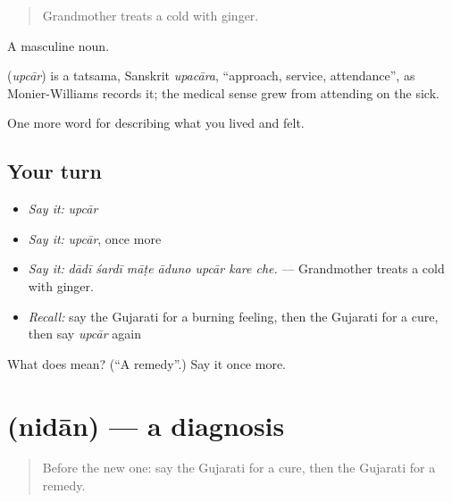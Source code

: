 \begin{quote}
Grandmother treats a cold with ginger.
\end{quote}

A masculine noun.

\begin{cousinweb}
\textbf{} (\emph{upcār}) is a tatsama, Sanskrit \emph{upacāra}, \textquotedblleft{}approach, service, attendance\textquotedblright{}, as Monier-Williams records it; the medical sense grew from attending on the sick.
\end{cousinweb}

\begin{grammarlens}[title={What you've built}]
One more word for describing what you lived and felt.
\end{grammarlens}

\subsection*{Your turn}
\begin{itemize}
\raggedright
  \item \emph{Say it:} \emph{upcār}
  \item \emph{Say it:} \emph{upcār}, once more
  \item \emph{Say it:} \emph{dādī śardī māṭe āduno upcār kare che.} — Grandmother treats a cold with ginger.
  \item \emph{Recall:} say the Gujarati for a burning feeling, then the Gujarati for a cure, then say \emph{upcār} again
\end{itemize}

\begin{tcolorbox}[breakable,colback=teal!4,colframe=teal!35!black,title={Before you move on}]
What does  mean? (\textquotedblleft{}A remedy\textquotedblright{}.) Say it once more.
\end{tcolorbox}
\section[\texorpdfstring{\gu{નિદાન} (nidān)}{નિદાન (nidān)}]{ (nidān) — a diagnosis}

\label{lesson:GU-C484-nidan}



\begin{quote}
Before the new one: say the Gujarati for a cure, then the Gujarati for a remedy.
\end{quote}

